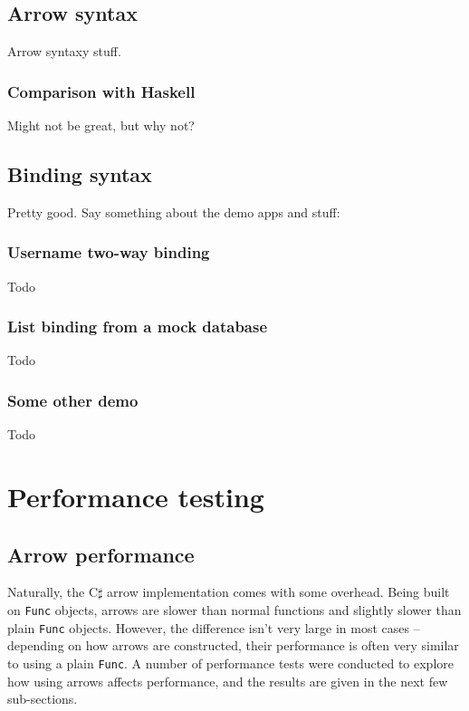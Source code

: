 \documentclass[12pt,twoside,notitlepage]{report}
\begin{document}
\subsection{Arrow syntax}

Arrow syntaxy stuff.

\subsubsection{Comparison with Haskell}

Might not be great, but why not?

\subsection{Binding syntax}

Pretty good. Say something about the demo apps and stuff:

\subsubsection{Username two-way binding}

Todo

\subsubsection{List binding from a mock database}

Todo

\subsubsection{Some other demo}

Todo

\section{Performance testing}

\subsection{Arrow performance}

Naturally, the C$\sharp$ arrow implementation comes with some overhead. Being built on \texttt{Func} objects, arrows are slower than normal functions and slightly slower than plain \texttt{Func} objects. However, the difference isn't very large in most cases -- depending on how arrows are constructed, their performance is often very similar to using a plain \texttt{Func}. A number of performance tests were conducted to explore how using arrows affects performance, and the results are given in the next few sub-sections.
\end{document}
